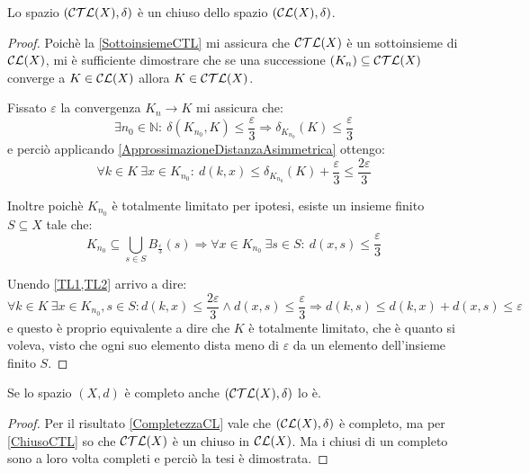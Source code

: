 \begin{lemma}\label{ChiusoCTL}
	Lo spazio $(\mathcal{CTL}(X),\delta)$ è un chiuso dello spazio $(\mathcal{CL}(X),\delta)$.
\end{lemma}
\begin{proof}
	Poichè la \cref{SottoinsiemeCTL} mi assicura che $\mathcal{CTL}(X)$ è un sottoinsieme di $\mathcal{CL}(X)$, mi è sufficiente dimostrare che se una successione $(K_n) \subseteq \mathcal{CTL}(X)$ converge a $K\in\mathcal{CL}(X)$ allora $K\in\mathcal{CTL}(X)$.
	
	Fissato $\varepsilon$ la convergenza $K_n\to K$ mi assicura che:
	\begin{equation*}
		\exists n_0\in\mathbb{N}:\ \delta(K_{n_0},K)\le \frac{\varepsilon}3
		\Longrightarrow \delta_{K_{n_0}}(K)\le \frac{\varepsilon}3
	\end{equation*}
	e perciò applicando \cref{ApprossimazioneDistanzaAsimmetrica} ottengo:
	\begin{equation}\label{TL1}
		\forall k\in K\ \exists x\in K_{n_0}:
		\ d(k,x)\le \delta_{K_{n_0}}(K)+\frac{\varepsilon}3\le \frac{2\varepsilon}3
	\end{equation}
	
	Inoltre poichè $K_{n_0}$ è totalmente limitato per ipotesi, esiste un insieme finito $S \subseteq X$ tale che:
	\begin{equation}\label{TL2}
		K_{n_0}\subseteq \bigcup_{s\in S} B_{\frac{\varepsilon}3}(s)
		\Longrightarrow \forall x\in K_{n_0}\ \exists s\in S:\ d(x,s)\le \frac{\varepsilon}3
	\end{equation}
	
	Unendo \cref{TL1,TL2} arrivo a dire:
	\begin{equation}
		\forall k\in K\ \exists x\in K_{n_0},s\in S: d(k,x)\le \frac{2\varepsilon}3 \wedge d(x,s)\le \frac{\varepsilon}3
		\Longrightarrow d(k,s)\le d(k,x)+d(x,s) \le \varepsilon
	\end{equation}
	e questo è proprio equivalente a dire che $K$ è totalmente limitato, che è quanto si voleva, visto che ogni suo elemento dista meno di $\varepsilon$ da un elemento dell'insieme finito $S$.
\end{proof}

\begin{corollary}\label{CompletezzaCTL}
	Se lo spazio $(X,d)$ è completo anche $(\mathcal{CTL}(X),\delta)$ lo è.
\end{corollary}
\begin{proof}
	Per il risultato \cref{CompletezzaCL} vale che $(\mathcal{CL}(X),\delta)$ è completo, ma per \cref{ChiusoCTL} so che $\mathcal{CTL}(X)$ è un chiuso in $\mathcal{CL}(X)$. Ma i chiusi di un completo sono a loro volta completi e perciò la tesi è dimostrata.
\end{proof}

